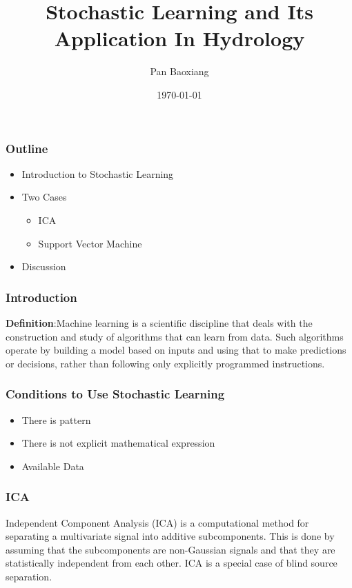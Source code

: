 \documentclass{beamer}
\begin{document}
 
\title{Stochastic Learning and Its Application In Hydrology}
\author{Pan Baoxiang}
\date{\today}
\maketitle

\begin{frame}
\frametitle{Outline}
\begin{itemize}
\item Introduction to Stochastic Learning
\item Two Cases
\begin{itemize}

\item ICA
\item Support Vector Machine

\end{itemize}
 
\item Discussion
\end{itemize}
\end{frame}

\begin{frame}
\frametitle{Introduction}
\textbf{Definition}:Machine learning is a scientific discipline that deals with the construction and study of algorithms that can learn from data. Such algorithms operate by building a model based on inputs  and using that to make predictions or decisions, rather than following only explicitly programmed instructions.
 
\end{frame}

\begin{frame}
\frametitle{Conditions to Use Stochastic Learning}
\begin{itemize}
\item There is pattern
\item There is not explicit mathematical expression
\item Available Data
\end{itemize}
\end{frame}

\begin{frame}
\frametitle{ICA}
Independent Component Analysis (ICA) is a computational method for separating a multivariate signal into additive subcomponents. This is done by assuming that the subcomponents are non-Gaussian signals and that they are statistically independent from each other. ICA is a special case of blind source separation.

\end{frame}
\end{document}
